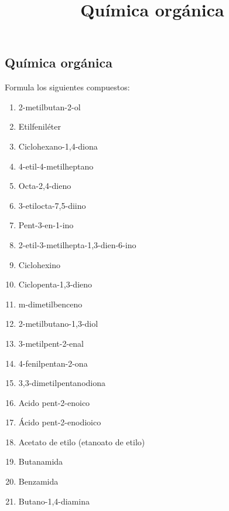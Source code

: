 \documentclass[
]{article}
\title{Química orgánica}
\author{}
\date{}
\providecommand{\tightlist}{%
  \setlength{\itemsep}{0pt}\setlength{\parskip}{0pt}}
\begin{document}
\maketitle

\hypertarget{quuxedmica-orguxe1nica}{%
\subsection{Química orgánica}\label{quuxedmica-orguxe1nica}}

\begin{exercise}[tags=OXF15] Formula los siguientes compuestos:

\begin{enumerate}
\def\labelenumi{\alph{enumi})}
\tightlist
\item
  2-metilbutan-2-ol
\item
  Etilfeniléter
\item
  Ciclohexano-1,4-diona
\item
  4-etil-4-metilheptano
\item
  Octa-2,4-dieno
\item
  3-etilocta-7,5-diino
\item
  Pent-3-en-1-ino
\item
  2-etil-3-metilhepta-1,3-dien-6-ino
\item
  Ciclohexino
\item
  Ciclopenta-1,3-dieno
\item
  m-dimetilbenceno
\item
  2-metilbutano-1,3-diol
\item
  3-metilpent-2-enal
\item
  4-fenilpentan-2-ona
\item
  3,3-dimetilpentanodiona
\item
  Acido pent-2-enoico
\item
  Ácido pent-2-enodioico
\item
  Acetato de etilo (etanoato de etilo)
\item
  Butanamida
\item
  Benzamida
\item
  Butano-1,4-diamina
\end{enumerate}

\end{exercise}
\end{document}
